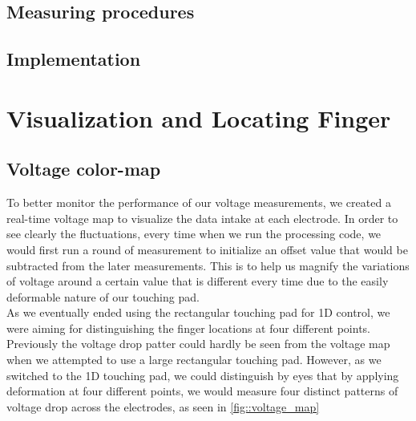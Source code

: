 \documentclass[reprint,amsmath, amsfonts, amssymb, aps, letterpaper]{revtex4-1}
\begin{document}
\subsection{Measuring procedures}
\subsection{Implementation}

\section{Visualization and Locating Finger}
\subsection{Voltage color-map}
To better monitor the performance of our voltage measurements, we created a real-time voltage map to visualize the data intake at each electrode. In order to see clearly the fluctuations, every time when we run the processing code, we would first run a round of measurement to initialize an offset value that would be subtracted from the later measurements. This is to help us magnify the variations of voltage around a certain value that is different every time due to the easily deformable nature of our touching pad.
\\\indent As we eventually ended using the rectangular touching pad for 1D control, we were aiming for distinguishing the finger locations at four different points. Previously the voltage drop patter could hardly be seen from the voltage map when we attempted to use a large rectangular touching pad. However, as we switched to the 1D touching pad, we could distinguish by eyes that by applying deformation at four different points, we would measure four distinct patterns of voltage drop across the electrodes, as seen in \ref{fig::voltage_map}
\end{document}
